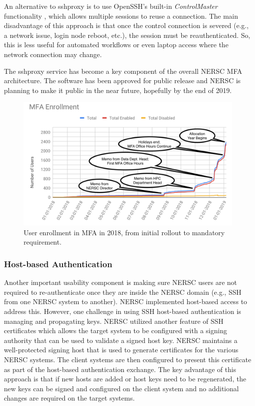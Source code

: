 \documentclass[sigconf,review]{acmart}
\begin{document}
An alternative to sshproxy is to use OpenSSH's built-in \textit{ControlMaster}
functionality \cite{openssh}, which allows multiple sessions to reuse a
connection. The main disadvantage of this approach is that once the control
connection is severed (e.g., a network issue, login node
reboot, etc.), the session must be reauthenticated.  So, this is less useful
for automated workflows or even laptop access where the network connection may
change.

The sshproxy service has become a key component of the overall NERSC MFA
architecture. The software has been approved for public release and NERSC is
planning to make it public in the near future, hopefully by the end of 2019.

\begin{figure}[ht!]
  \centering
  \includegraphics[width=\textwidth]{mfa-enrollment.png}
  \caption{User enrollment in MFA in 2018, from initial rollout to mandatory requirement.}
  \label{uptake}
\end{figure}

\subsubsection{Host-based Authentication}
\label{host}

Another important usability component is making sure NERSC users are not
required to re-authenticate once they are inside the NERSC domain (e.g., SSH
from one NERSC system to another).  NERSC implemented host-based access to
address this.  However, one challenge in using SSH host-based authentication is
managing and propagating keys.  NERSC utilized another feature of SSH
certificates \cite{redhat2019} which allows the target system to be configured
with a signing authority that can be used to validate a signed host key.  NERSC
maintains a well-protected signing host that is used to generate certificates
for the various NERSC systems.  The client systems are then configured to
present this certificate as part of the host-based authentication exchange.  The
key advantage of this approach is that if new hosts are added or host keys need
to be regenerated, the new keys can be signed and configured on the client
system and no additional changes are required on the target systems.
\end{document}
